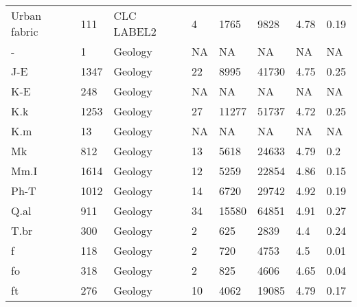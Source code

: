 \documentclass[unnumsec,webpdf,contemporary,large]{oup-authoring-template}%
\theoremstyle{thmstyleone}%
\theoremstyle{thmstyletwo}%
\theoremstyle{thmstylethree}%
\begin{document}
\begin{sidewaystable*}
\begin{tabular*}{\textwidth}{@{\extracolsep{\fill}}llllllll@{\extracolsep{\fill}}}
Urban fabric                                    & 111  & CLC LABEL2           & 4       & 1765           & 9828          & 4.78          & 0.19        \\
-                                               & 1    & Geology              & NA      & NA             & NA            & NA            & NA          \\
J-E                                             & 1347 & Geology              & 22      & 8995           & 41730         & 4.75          & 0.25        \\
K-E                                             & 248  & Geology              & NA      & NA             & NA            & NA            & NA          \\
K.k                                             & 1253 & Geology              & 27      & 11277          & 51737         & 4.72          & 0.25        \\
K.m                                             & 13   & Geology              & NA      & NA             & NA            & NA            & NA          \\
Mk                                              & 812  & Geology              & 13      & 5618           & 24633         & 4.79          & 0.2         \\
Mm.I                                            & 1614 & Geology              & 12      & 5259           & 22854         & 4.86          & 0.15        \\
Ph-T                                            & 1012 & Geology              & 14      & 6720           & 29742         & 4.92          & 0.19        \\
Q.al                                            & 911  & Geology              & 34      & 15580          & 64851         & 4.91          & 0.27        \\
T.br                                            & 300  & Geology              & 2       & 625            & 2839          & 4.4           & 0.24        \\
f                                               & 118  & Geology              & 2       & 720            & 4753          & 4.5           & 0.01        \\
fo                                              & 318  & Geology              & 2       & 825            & 4606          & 4.65          & 0.04        \\
ft                                              & 276  & Geology              & 10      & 4062           & 19085         & 4.79          & 0.17        \\

\end{tabular*}
\end{sidewaystable*}
\end{document}
